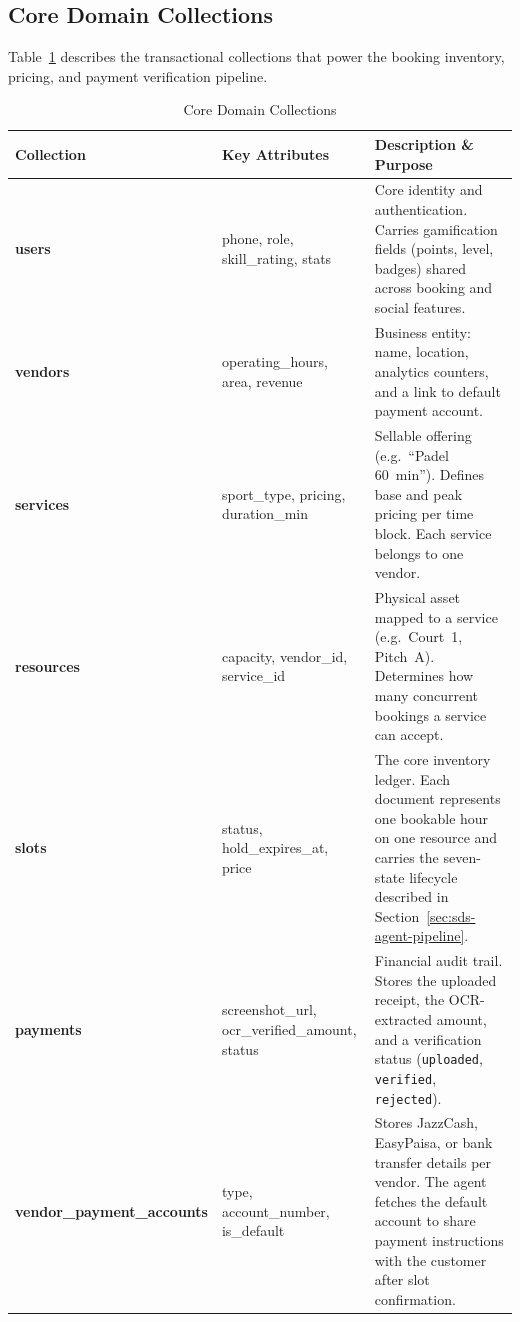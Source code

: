 \subsection{Core Domain Collections}
Table~\ref{tab:entities-core} describes the transactional collections that power the
booking inventory, pricing, and payment verification pipeline.

\begin{table}[H]
    \centering
    \caption{Core Domain Collections}
    \label{tab:entities-core}
    \small
    \setlength{\tabcolsep}{4pt}
    \begin{tabular}{|p{3.0cm}|p{4.2cm}|p{6.0cm}|}
    \hline
    \textbf{Collection} & \textbf{Key Attributes} & \textbf{Description \& Purpose} \\ \hline
    \textbf{users} & phone, role, skill\_rating, stats & Core identity and authentication. Carries gamification fields (points, level, badges) shared across booking and social features. \\ \hline
    \textbf{vendors} & operating\_hours, area, revenue & Business entity: name, location, analytics counters, and a link to default payment account. \\ \hline
    \textbf{services} & sport\_type, pricing, duration\_min & Sellable offering (e.g.\ ``Padel 60~min''). Defines base and peak pricing per time block. Each service belongs to one vendor. \\ \hline
    \textbf{resources} & capacity, vendor\_id, service\_id & Physical asset mapped to a service (e.g.\ Court~1, Pitch~A). Determines how many concurrent bookings a service can accept. \\ \hline
    \textbf{slots} & status, hold\_expires\_at, price & The core inventory ledger. Each document represents one bookable hour on one resource and carries the seven-state lifecycle described in Section~\ref{sec:sds-agent-pipeline}. \\ \hline
    \textbf{payments} & screenshot\_url, ocr\_verified\_amount, status & Financial audit trail. Stores the uploaded receipt, the OCR-extracted amount, and a verification status (\texttt{uploaded}, \texttt{verified}, \texttt{rejected}). \\ \hline
    {\scriptsize\textbf{vendor\_payment\_\allowbreak accounts}} & type, account\_number, is\_default & Stores JazzCash, EasyPaisa, or bank transfer details per vendor. The agent fetches the default account to share payment instructions with the customer after slot confirmation. \\ \hline
    \end{tabular}
\end{table}

